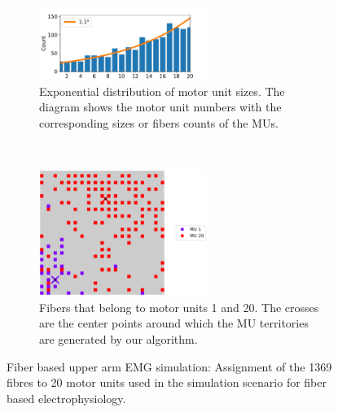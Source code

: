 \begin{figure}[H]
  \centering%
  \begin{subfigure}[t]{\textwidth}%
    \centering%
    \includegraphics[width=0.6\textwidth]{images/results/application/MU_fibre_distribution_37x37_20c_txt_fiber_distribution_.pdf}%
    \caption{Exponential distribution of motor unit sizes. The diagram shows the motor unit numbers with the corresponding sizes or fibers counts of the MUs.}%
    \label{fig:MU_fibre_distribution_37x37_20c_txt_fiber_distribution}%
  \end{subfigure}\\
  \begin{subfigure}[t]{\textwidth}%
    \centering%
    \includegraphics[width=0.6\textwidth]{images/results/application/MU_fibre_distribution_37x37_20c_txt_2d_fiber_distribution_.pdf}%
    \caption{Fibers that belong to motor units 1 and 20. The crosses are the center points around which the MU territories are generated by our algorithm.}%
    \label{fig:MU_fibre_distribution_37x37_20c_txt_2d_fiber_distribution}%
  \end{subfigure}
  \caption{Fiber based upper arm EMG simulation: Assignment of the 1369 fibres to 20 motor units used in the simulation scenario for fiber based electrophysiology.}%
  \label{fig:MU_fibre_distribution_37x37_20c}%
\end{figure}%

